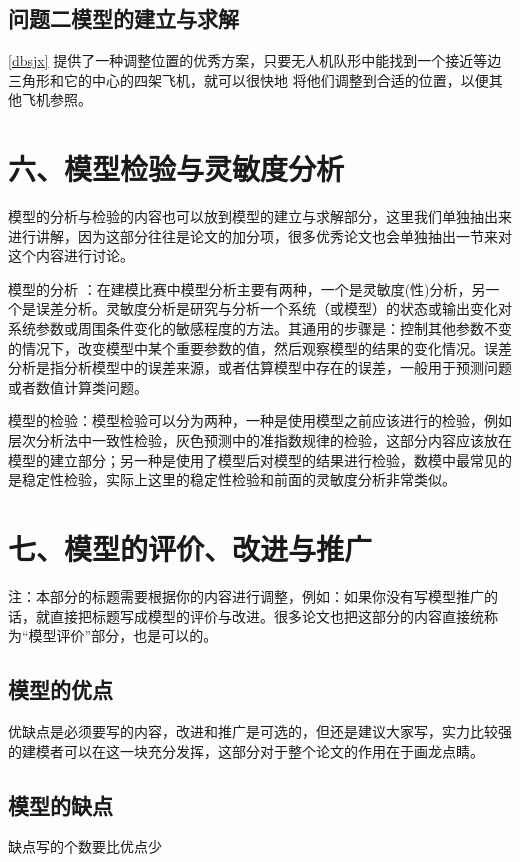 \documentclass{my_paper}
\begin{document}
\subsection{问题二模型的建立与求解}

\ref{dbsjx} 提供了一种调整位置的优秀方案，只要无人机队形中能找到一个接近等边三角形和它的中心的四架飞机，就可以很快地
将他们调整到合适的位置，以便其他飞机参照。


\section{六、模型检验与灵敏度分析}

模型的分析与检验的内容也可以放到模型的建立与求解部分，这里我们单独抽出来进行讲解，因为这部分往往是论文的加分项，很多优秀论文也会单独抽出一节来对这个内容进行讨论。

模型的分析 ：在建模比赛中模型分析主要有两种，一个是灵敏度(性)分析，另一个是误差分析。灵敏度分析是研究与分析一个系统（或模型）的状态或输出变化对系统参数或周围条件变化的敏感程度的方法。其通用的步骤是：控制其他参数不变的情况下，改变模型中某个重要参数的值，然后观察模型的结果的变化情况。误差分析是指分析模型中的误差来源，或者估算模型中存在的误差，一般用于预测问题或者数值计算类问题。

模型的检验：模型检验可以分为两种，一种是使用模型之前应该进行的检验，例如层次分析法中一致性检验，灰色预测中的准指数规律的检验，这部分内容应该放在模型的建立部分；另一种是使用了模型后对模型的结果进行检验，数模中最常见的是稳定性检验，实际上这里的稳定性检验和前面的灵敏度分析非常类似。

\section{七、模型的评价、改进与推广}
注：本部分的标题需要根据你的内容进行调整，例如：如果你没有写模型推广的话，就直接把标题写成模型的评价与改进。很多论文也把这部分的内容直接统称为“模型评价”部分，也是可以的。

\subsection{模型的优点}
优缺点是必须要写的内容，改进和推广是可选的，但还是建议大家写，实力比较强的建模者可以在这一块充分发挥，这部分对于整个论文的作用在于画龙点睛。
\subsection{模型的缺点}
缺点写的个数要比优点少
\end{document}
